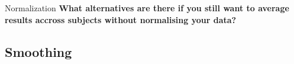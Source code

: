 \documentclass{beamer}
\begin{document}
\begin{frame}{Normalization}
  \textbf{What alternatives are there if you still want to average results accross subjects without normalising your data?}

\end{frame}

% 

\subsection[Smoothing]{Smoothing}
\end{document}
